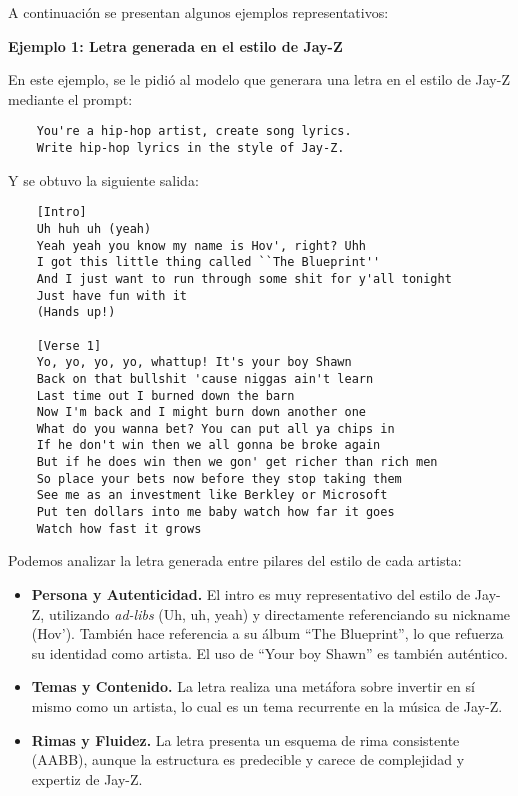 \documentclass[paper=letter, fontsize=11pt, draft=false]{scrartcl}
\numberwithin{equation}{section} %
\numberwithin{figure}{section} %
\numberwithin{table}{section} %
\numberwithin{subsection}{section}
\begin{document}
A continuación se presentan algunos ejemplos representativos:

\textbf{Ejemplo 1: Letra generada en el estilo de Jay-Z}

En este ejemplo, se le pidió al modelo que generara una letra en el estilo de Jay-Z mediante el prompt:

\begin{verbatim}
    You're a hip-hop artist, create song lyrics. 
    Write hip-hop lyrics in the style of Jay-Z.
\end{verbatim}

Y se obtuvo la siguiente salida:

\begin{verbatim}
    [Intro]
    Uh huh uh (yeah)
    Yeah yeah you know my name is Hov', right? Uhh
    I got this little thing called ``The Blueprint''
    And I just want to run through some shit for y'all tonight
    Just have fun with it
    (Hands up!)

    [Verse 1]
    Yo, yo, yo, yo, whattup! It's your boy Shawn
    Back on that bullshit 'cause niggas ain't learn
    Last time out I burned down the barn
    Now I'm back and I might burn down another one
    What do you wanna bet? You can put all ya chips in
    If he don't win then we all gonna be broke again
    But if he does win then we gon' get richer than rich men
    So place your bets now before they stop taking them
    See me as an investment like Berkley or Microsoft
    Put ten dollars into me baby watch how far it goes
    Watch how fast it grows
\end{verbatim}

Podemos analizar la letra generada entre pilares del estilo de cada artista:

\begin{itemize}
    \item \textbf{Persona y Autenticidad.} El intro es muy representativo del estilo de Jay-Z, utilizando \textit{ad-libs} (Uh, uh, yeah) y directamente referenciando su nickname (Hov'). También hace referencia a su álbum ``The Blueprint'', lo que refuerza su identidad como artista. El uso de ``Your boy Shawn'' es también auténtico.
    
    \item \textbf{Temas y Contenido.} La letra realiza una metáfora sobre invertir en sí mismo como un artista, lo cual es un tema recurrente en la música de Jay-Z.

    \item \textbf{Rimas y Fluidez.} La letra presenta un esquema de rima consistente (AABB), aunque la estructura es predecible y carece de complejidad y expertiz de Jay-Z.
\end{itemize}
\end{document}
